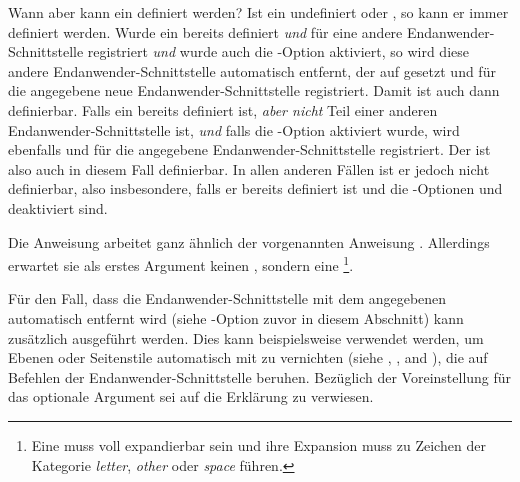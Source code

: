 Wann aber kann ein  definiert
werden? Ist ein  undefiniert oder , so kann er
immer definiert werden. Wurde ein  bereits definiert \emph{und}
für eine andere Endanwender-Schnittstelle registriert \emph{und} wurde auch die
\KOMAScript-Option  aktiviert, so wird diese
andere Endanwender-Schnittstelle automatisch entfernt, der  auf
 gesetzt und für die angegebene neue Endanwender-Schnittstelle
registriert. Damit ist  auch dann definierbar. Falls ein
 bereits definiert ist, \emph{aber nicht} Teil einer anderen
Endanwender-Schnittstelle ist, \emph{und} falls die \KOMAScript-Option
 aktiviert wurde, wird  ebenfalls
 und für die angegebene Endanwender-Schnittstelle
registriert. Der  ist also auch in diesem Fall definierbar. In
allen anderen Fällen ist er jedoch nicht definierbar, also insbesondere, falls
er bereits definiert ist und die \KOMAScript-Optionen
 und  deaktiviert sind.

Die Anweisung  arbeitet ganz ähnlich der
vorgenannten Anweisung . Allerdings erwartet sie
als erstes Argument keinen , sondern eine
\footnote{Eine  muss voll
  expandierbar sein und ihre Expansion muss zu Zeichen der Kategorie
  \emph{letter}, \emph{other} oder \emph{space} führen.}.%
%
\EndIndexGroup


\begin{Declaration}
\end{Declaration}
Für den Fall, dass die Endanwender-Schnittstelle mit dem angegebenen
 automatisch entfernt wird (siehe
\KOMAScript-Option  zuvor in
diesem Abschnitt) kann zusätzlich  ausgeführt werden. Dies kann
beispielsweise verwendet werden, um Ebenen oder Seitenstile automatisch mit zu
vernichten (siehe ,
, and
), die auf Befehlen der
Endanwender-Schnittstelle beruhen. Bezüglich der Voreinstellung für das
optionale Argument sei auf die Erklärung zu
 verwiesen.%
\EndIndexGroup%
\fi%
%
\EndIndexGroup


